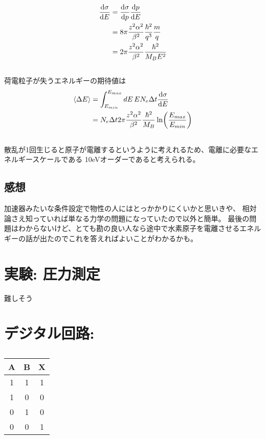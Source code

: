 \documentclass[../../master.tex]{subfiles}
\begin{document}
\subsection{}
\begin{align}
    \dv{\sigma}{E} &= \dv{\sigma}{p}\dv{p}{E}\\
    &= 8\pi\frac{z^2\alpha^2}{\beta^2}\frac{\hbar^2}{q^3}\frac{m}{q}\\
    &= 2\pi\frac{z^2\alpha^2}{\beta^2}\frac{\hbar^2}{M_B E^2}
\end{align}

\subsection{}
荷電粒子が失うエネルギーの期待値は
\begin{align}
    \ev{\Delta E} &= \int_{E_{min}}^{E_{max}}dE\, E N_e\Delta t \dv{\sigma}{E}\\
    &= N_e\Delta t2\pi\frac{z^2\alpha^2}{\beta^2}\frac{\hbar^2}{M_B}\ln(\frac{E_{max}}{E_{min}})
\end{align}

\subsection{}
散乱が1回生じると原子が電離するというように考えれるため、電離に必要なエネルギースケールである 10eVオーダーであると考えられる。

\subsection*{感想}
加速器みたいな条件設定で物性の人にはとっかかりにくいかと思いきや、
相対論さえ知っていれば単なる力学の問題になっていたので以外と簡単。
最後の問題はわからないけど、とても勘の良い人なら途中で水素原子を電離させるエネルギーの話が出たのでこれを答えればよいことがわかるかも。

\section{実験: 圧力測定}
難しそう

\section{デジタル回路: }
\subsection{}
\begin{tabular}{ccc}
    \hline
    A & B & X\\
    \hline
    1 & 1 & 1 \\
    1 & 0 & 0 \\
    0 & 1 & 0\\
    0 & 0 & 1\\
    \hline
\end{tabular}
\end{document}
